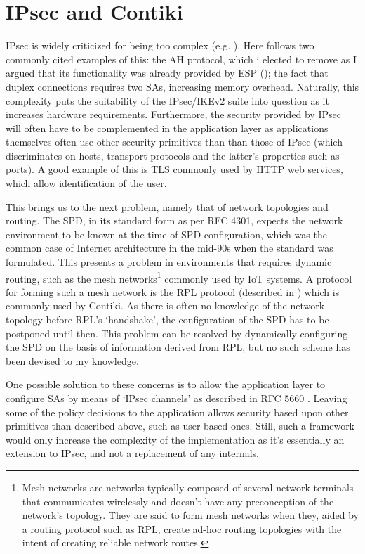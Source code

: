 \documentclass[final,a4paper,twoside,11pt,onecolumn]{report}
\begin{document}
\section{IPsec and Contiki}
IPsec is widely criticized for being too complex (e.g. \cite{Ferguson00acryptographic}). Here follows two commonly cited examples of this: the AH protocol, which i elected to remove as I argued that its functionality was already provided by ESP (); the fact that duplex connections requires two SAs, increasing memory overhead. Naturally, this complexity puts the suitability of the IPsec/IKEv2 suite into question as it increases hardware requirements. Furthermore, the security provided by IPsec will often have to be complemented in the application layer as applications themselves often use other security primitives than than those of IPsec (which discriminates on hosts, transport protocols and the latter's properties such as ports). A good example of this is TLS commonly used by HTTP web services, which allow identification of the user.


This brings us to the next problem, namely that of network topologies and routing. The SPD, in its standard form as per RFC 4301, expects the network environment to be known at the time of SPD configuration, which was the common case of Internet architecture in the mid-90s when the standard was formulated. This presents a problem in environments that requires dynamic routing, such as the mesh networks\footnote{Mesh networks are networks typically composed of several network terminals that communicates wirelessly and doesn't have any preconception of the network's topology. They are said to form mesh networks when they, aided by a routing protocol such as RPL, create ad-hoc routing topologies with the intent of creating reliable network routes.} commonly used by IoT systems. A protocol for forming such a mesh network is the RPL protocol (described in \cite{rfc6550}) which is commonly used by Contiki. As there is often no knowledge of the network topology before RPL's `handshake', the configuration of the SPD has to be postponed until then. This problem can be resolved by dynamically configuring the SPD on the basis of information derived from RPL, but no such scheme has been devised to my knowledge.

One possible solution to these concerns is to allow the application layer to configure SAs by means of `IPsec channels' as described in RFC 5660 \cite{rfc5660}. Leaving some of the policy decisions to the application allows security based upon other primitives than described above, such as user-based ones. Still, such a framework would only increase the complexity of the implementation as it's essentially an extension to IPsec, and not a replacement of any internals.
\end{document}
